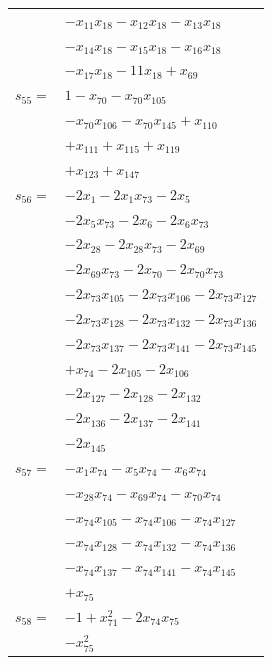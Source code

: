 \begin{longtable}{@{}r@{\;}l@{}}
 & \(\displaystyle -x_{11}x_{18} -x_{12}x_{18} -x_{13}x_{18}\) \\
 & \(\displaystyle -x_{14}x_{18} -x_{15}x_{18} -x_{16}x_{18}\) \\
 & \(\displaystyle -x_{17}x_{18} -11x_{18} +x_{69}\) \\[3pt]
\(s_{55}=\) & \(\displaystyle 1 -x_{70} -x_{70}x_{105}\) \\
 & \(\displaystyle -x_{70}x_{106} -x_{70}x_{145} +x_{110}\) \\
 & \(\displaystyle +x_{111} +x_{115} +x_{119}\) \\
 & \(\displaystyle +x_{123} +x_{147}\) \\[3pt]
\(s_{56}=\) & \(\displaystyle -2x_{1} -2x_{1}x_{73} -2x_{5}\) \\
 & \(\displaystyle -2x_{5}x_{73} -2x_{6} -2x_{6}x_{73}\) \\
 & \(\displaystyle -2x_{28} -2x_{28}x_{73} -2x_{69}\) \\
 & \(\displaystyle -2x_{69}x_{73} -2x_{70} -2x_{70}x_{73}\) \\
 & \(\displaystyle -2x_{73}x_{105} -2x_{73}x_{106} -2x_{73}x_{127}\) \\
 & \(\displaystyle -2x_{73}x_{128} -2x_{73}x_{132} -2x_{73}x_{136}\) \\
 & \(\displaystyle -2x_{73}x_{137} -2x_{73}x_{141} -2x_{73}x_{145}\) \\
 & \(\displaystyle +x_{74} -2x_{105} -2x_{106}\) \\
 & \(\displaystyle -2x_{127} -2x_{128} -2x_{132}\) \\
 & \(\displaystyle -2x_{136} -2x_{137} -2x_{141}\) \\
 & \(\displaystyle -2x_{145}\) \\[3pt]
\(s_{57}=\) & \(\displaystyle -x_{1}x_{74} -x_{5}x_{74} -x_{6}x_{74}\) \\
 & \(\displaystyle -x_{28}x_{74} -x_{69}x_{74} -x_{70}x_{74}\) \\
 & \(\displaystyle -x_{74}x_{105} -x_{74}x_{106} -x_{74}x_{127}\) \\
 & \(\displaystyle -x_{74}x_{128} -x_{74}x_{132} -x_{74}x_{136}\) \\
 & \(\displaystyle -x_{74}x_{137} -x_{74}x_{141} -x_{74}x_{145}\) \\
 & \(\displaystyle +x_{75}\) \\[3pt]
\(s_{58}=\) & \(\displaystyle -1 +x_{71}^{2} -2x_{74}x_{75}\) \\
 & \(\displaystyle -x_{75}^{2}\) \\[3pt]

\end{longtable}
